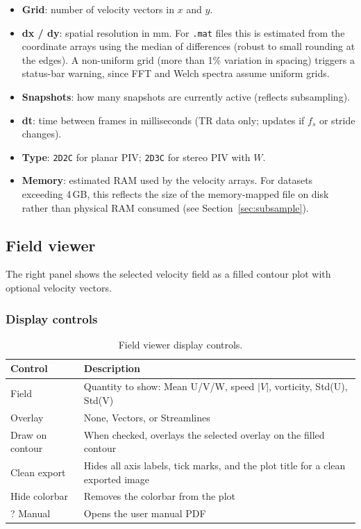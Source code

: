 \begin{itemize}[leftmargin=1.5em]
  \item \textbf{Grid}: number of velocity vectors in $x$ and $y$.
  \item \textbf{dx / dy}: spatial resolution in mm. For \texttt{.mat} files this is estimated from the coordinate arrays using the median of differences (robust to small rounding at the edges). A non-uniform grid (more than 1\% variation in spacing) triggers a status-bar warning, since FFT and Welch spectra assume uniform grids.
  \item \textbf{Snapshots}: how many snapshots are currently active (reflects subsampling).
  \item \textbf{dt}: time between frames in milliseconds (TR data only; updates if $f_s$ or stride changes).
  \item \textbf{Type}: \texttt{2D2C} for planar PIV; \texttt{2D3C} for stereo PIV with $W$.
  \item \textbf{Memory}: estimated RAM used by the velocity arrays. For datasets exceeding 4\,GB, this reflects the size of the memory-mapped file on disk rather than physical RAM consumed (see Section~\ref{sec:subsample}).
\end{itemize}

\subsection{Field viewer}

The right panel shows the selected velocity field as a filled contour plot with optional velocity vectors.

\subsubsection{Display controls}

\begin{table}[htbp]
\centering
\caption{Field viewer display controls.}
\begin{tabular}{lp{9cm}}
\toprule
\textbf{Control} & \textbf{Description} \\
\midrule
Field         & Quantity to show: Mean U/V/W, speed $|V|$, vorticity, Std(U), Std(V) \\
Overlay       & None, Vectors, or Streamlines \\
Draw on contour & When checked, overlays the selected overlay on the filled contour \\
Clean export  & Hides all axis labels, tick marks, and the plot title for a clean exported image \\
Hide colorbar & Removes the colorbar from the plot \\
? Manual      & Opens the user manual PDF \\
\bottomrule
\end{tabular}
\end{table}

